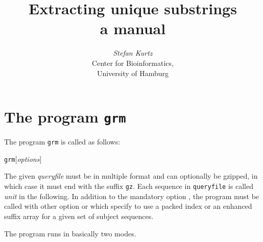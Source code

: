 \documentclass[12pt]{article}
\title{Extracting unique substrings\\
a manual}
\author{\begin{tabular}{c}
         \textit{Stefan Kurtz}\\
         Center for Bioinformatics,\\
         University of Hamburg
        \end{tabular}}
\newcommand{\GRM}[0]{\texttt{grm}\xspace}
\begin{document}
\maketitle

\section{The program \GRM}

The program \GRM is called as follows:
\par
\noindent\GRM [\textit{options}]  
\par
The given \textit{queryfile} must be in multiple 
\Fasta format and can optionally be gzipped, in which case it must end 
with the suffix \texttt{gz}.
Each sequence in \texttt{queryfile} is called \textit{unit} in the following.
In addition to the mandatory option , the program
must be called with other option  or 
which specify to use a packed index or an enhanced suffix array for 
a given set of subject sequences.

The program runs in basically two modes. 
\end{document}
